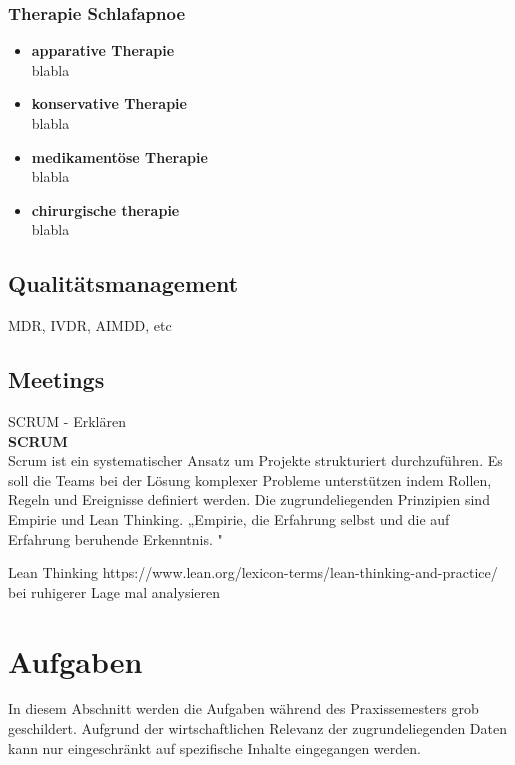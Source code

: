 \documentclass[a4paper, 12pt]{article}
\begin{document}
\subsubsection{Therapie Schlafapnoe}\label{therapy}
\begin{itemize}
\item \textbf{apparative Therapie}\\
blabla

\item \textbf{konservative Therapie}\\
blabla

\item \textbf{medikamentöse Therapie}\\
blabla

\item \textbf{chirurgische therapie}\\
blabla
\end{itemize}

\subsection{Qualitätsmanagement}\label{Qualitätsmanagement}
MDR, IVDR, AIMDD, etc

\subsection{Meetings}\label{Meetings}
SCRUM - Erklären
\\ 
\textbf{SCRUM}\\
Scrum ist ein systematischer Ansatz um Projekte strukturiert durchzuführen. Es soll die Teams bei der Lösung komplexer Probleme unterstützen indem Rollen, Regeln und Ereignisse definiert werden. Die zugrundeliegenden Prinzipien sind Empirie und Lean Thinking. 
„Empirie, die Erfahrung selbst und die auf Erfahrung beruhende Erkenntnis.  
 \cite{dorsch_empirie}"
 
Lean Thinking https://www.lean.org/lexicon-terms/lean-thinking-and-practice/
bei ruhigerer Lage mal analysieren %
 

\cite{scrum2020}


\newpage
\section{Aufgaben}\label{Aufgaben}
In diesem Abschnitt werden die Aufgaben während des Praxissemesters grob geschildert. Aufgrund der wirtschaftlichen Relevanz der zugrundeliegenden Daten kann nur eingeschränkt auf spezifische Inhalte eingegangen werden.
\end{document}
